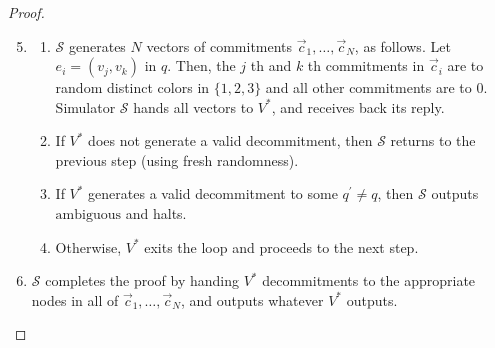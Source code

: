 \documentclass{beamer}
\begin{document}
    \begin{frame}
        \frametitle{}
        \begin{proof}
            \begin{enumerate}
                \setcounter{enumi}{4}
                \item \begin{enumerate}
                    \item $\mathcal{S}$ generates $N$ vectors of commitments $\vec{c}_{1}, \ldots, \vec{c}_{N}$, as follows. Let $e_{i}=\left(v_{j}, v_{k}\right)$ in $q$. Then, the $j$ th and $k$ th commitments in $\vec{c}_{i}$ are to random distinct colors in $\{1,2,3\}$ and all other commitments are to 0. Simulator $\mathcal{S}$ hands all vectors to $V^{*}$, and receives back its reply.
                    \item  If $V^{*}$ does not generate a valid decommitment, then $\mathcal{S}$ returns to the previous step (using fresh randomness).
                    \item If $V^{*}$ generates a valid decommitment to some $q^{\prime} \neq q$, then $\mathcal{S}$ outputs $\mathrm{ambiguous}$ and halts.
                    \item Otherwise, $V^{*}$ exits the loop and proceeds to the next step.
                \end{enumerate}
                \item $\mathcal{S}$ completes the proof by handing $V^{*}$ decommitments to the appropriate nodes in all of $\vec{c}_{1}, \ldots, \vec{c}_{N}$, and outputs whatever $V^{*}$ outputs.
            \end{enumerate}
        \end{proof}
        
    \end{frame}
\end{document}
